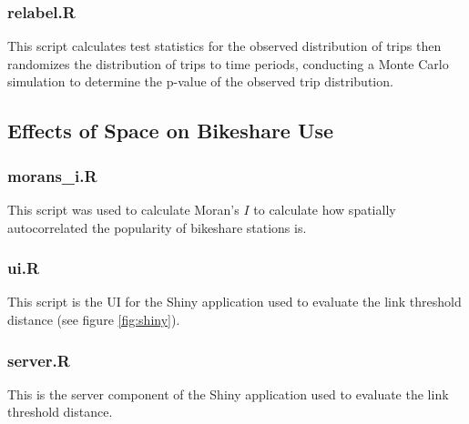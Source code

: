 \documentclass[letterpaper,11pt]{article}
\begin{document}


\subsubsection{relabel.R}
\label{relabel.R}

This script calculates test statistics for the observed distribution
of trips then randomizes the distribution of trips to time periods,
conducting a Monte Carlo simulation to determine the p-value of the
observed trip distribution.



\subsection{Effects of Space on Bikeshare Use}
\subsubsection{morans\_i.R}
\label{morans_i.R}

This script was used to calculate Moran's $I$ to calculate how
spatially autocorrelated the popularity of bikeshare stations is.



\subsubsection{ui.R}
\label{ui.R}

This script is the UI for the Shiny application used to evaluate the
link threshold distance (see figure \ref{fig:shiny}).



\subsubsection{server.R}
\label{server.R}

This is the server component of the Shiny application used to evaluate
the link threshold distance.


\end{document}
